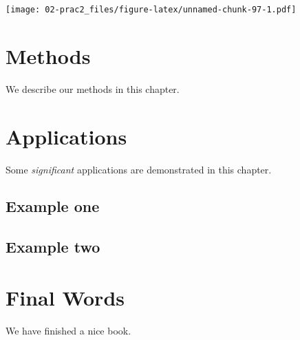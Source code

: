 \documentclass[]{book}
\begin{document}
\texttt{[image: 02-prac2\_files/figure-latex/unnamed-chunk-97-1.pdf]}

\hypertarget{methods}{%
\chapter{Methods}\label{methods}}

We describe our methods in this chapter.

\hypertarget{applications}{%
\chapter{Applications}\label{applications}}

Some \emph{significant} applications are demonstrated in this chapter.

\hypertarget{example-one}{%
\section{Example one}\label{example-one}}

\hypertarget{example-two}{%
\section{Example two}\label{example-two}}

\hypertarget{final-words}{%
\chapter{Final Words}\label{final-words}}

We have finished a nice book.


\end{document}

